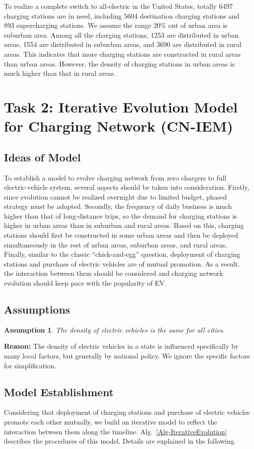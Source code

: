 \documentclass{mcmthesis}
\newtheorem{myassump}{Assumption}
\begin{document}
To realize a complete switch to all-electric in the United States, totally 6497 charging stations are in need, including 5604 destination charging stations and 893 supercharging stations. We assume the range 20\% out of urban area is suburban area. Among all the charging stations, 1253 are distributed in urban areas, 1554 are distributed in suburban areas, and 3690 are distributed in rural areas. This indicates that more charging stations are constructed in rural areas than urban areas. However, the density of charging stations in urban areas is much higher than that in rural areas.
\section{Task 2: Iterative Evolution Model for Charging Network (CN-IEM)}\label{Sec-Task2}
\subsection{Ideas of Model}
To establish a model to evolve charging network from zero chargers to full electric-vehicle system, several aspects should be taken into consideration. Firstly, since evolution cannot be realized overnight due to limited budget, phased strategy must be adopted. Secondly, the frequency of daily business is much higher than that of long-distance trips, so the demand for charging stations is higher in urban areas than in suburban and rural areas. Based on this, charging stations should first be constructed in some urban areas and then be deployed simultaneously in the rest of urban areas, suburban areas, and rural areas. Finally, similar to the classic ``chick-and-egg'' question, deployment of charging stations and purchase of electric vehicles are of mutual promotion. As a result, the interaction between them should be considered and charging network evolution should keep pace with the popularity of EV.
\subsection{Assumptions}
\begin{myassump}\label{Assump-EVDensity}
The density of electric vehicles is the same for all cities.
\end{myassump}
\noindent\textbf{Reason:} The density of electric vehicles in a state is influenced specifically by many local factors, but generally by national policy. We ignore the specific factors for simplification.
\subsection{Model Establishment}\label{Sec-IEMEstablishment}
Considering that deployment of charging stations and purchase of electric vehicles promote each other mutually, we build an iterative model to reflect the interaction between them along the timeline. Alg.~\ref{Alg-IterativeEvolution} describes the procedures of this model. Details are explained in the following.
\end{document}

